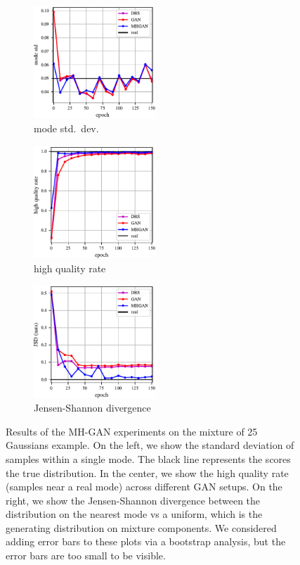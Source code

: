 \begin{figure}[htbp]
    \centering
    \begin{subfigure}[b]{0.32\textwidth}
       \centering
       \includegraphics[width=1.8in]{figures/std.pdf}
       \caption{mode std.~dev.}
       \label{fig:std}
    \end{subfigure}
    \begin{subfigure}[b]{0.32\textwidth}
       \centering
       \includegraphics[width=1.8in]{figures/hqr.pdf}
       \caption{high quality rate}
       \label{fig:hqr}
    \end{subfigure}
    \begin{subfigure}[b]{0.32\textwidth}
       \centering
       \includegraphics[width=1.8in]{figures/jsd.pdf}
       \caption{Jensen-Shannon divergence}
       \label{fig:jsd}
    \end{subfigure}
    \caption{{\small
    Results of the MH-GAN experiments on the mixture of 25 Gaussians example.
    On the left, we show the standard deviation of samples within a single mode.
    The black line represents the scores the true distribution.
    In the center, we show the high quality rate (samples near a real mode) across different GAN setups.
    On the right, we show the Jensen-Shannon divergence between the distribution on the nearest mode vs a uniform, which is the generating distribution on mixture components.
    We considered adding error bars to these plots via a bootstrap analysis, but the error bars are too small to be visible.
    }}
    \label{fig:mog_metrics}
\end{figure}

